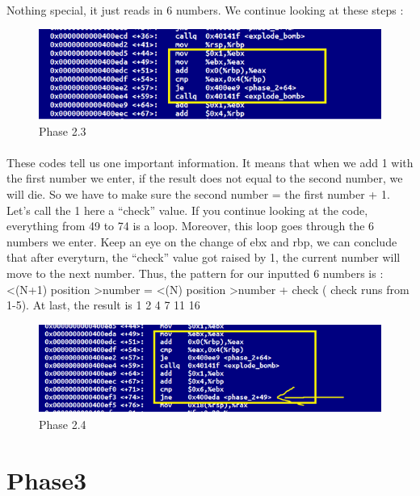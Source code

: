 \documentclass[a4paper]{article}
\begin{document}
\paragraph{}
Nothing special, it just reads in 6 numbers. We continue looking at these steps  : 

\begin{figure}[h!]
  \includegraphics[width=\linewidth]{bai2_3.png}
  \caption{Phase 2.3}
  \label{}
\end{figure}

\paragraph{}
These codes tell us one important information. It means that when we add 1 with the first number we enter, if the result does not equal to the second number, we will die. So we have to make sure the second number = the first number + 1.  Let’s call the 1 here a “check” value. If you continue looking at the code, everything from 49 to 74 is a loop. Moreover, this loop goes through the 6 numbers we enter. Keep an eye on the change of ebx and rbp, we can conclude that after everyturn, the “check” value got raised by 1, the current number will move to the next number. Thus, the pattern for our inputted 6 numbers is :  \textless (N+1) position \textgreater number = \textless (N) position \textgreater number + check ( check runs from 1-5). At last, the result is 1 2 4 7 11 16 

\begin{figure}[h!]
  \includegraphics[width=\linewidth]{bai2_4.png}
  \caption{Phase 2.4}
  \label{}
\end{figure}

\newpage
\section{Phase3}
\end{document}
